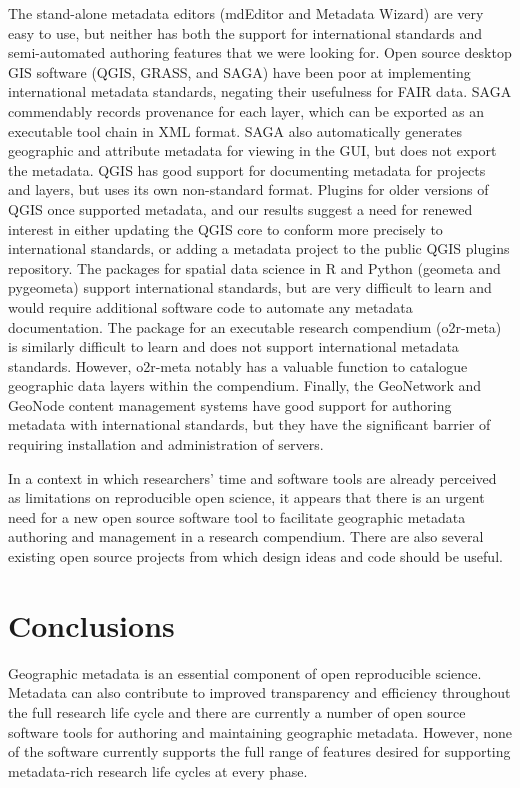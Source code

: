 \documentclass{isprs} %
\begin{document}
The stand-alone metadata editors (mdEditor and Metadata Wizard) are very easy to use, but neither has both the support for international standards and semi-automated authoring features that we were looking for.
Open source desktop GIS software (QGIS, GRASS, and SAGA) have been poor at implementing international metadata standards, negating their usefulness for FAIR data.
SAGA commendably records provenance for each layer, which can be exported as an executable tool chain in XML format.
SAGA also automatically generates geographic and attribute metadata for viewing in the GUI, but does not export the metadata.
QGIS has good support for documenting metadata for projects and layers, but uses its own non-standard format.
Plugins for older versions of QGIS once supported metadata, and our results suggest a need for renewed interest in either updating the QGIS core to conform more precisely to international standards, or adding a metadata project to the public QGIS plugins repository.
The packages for spatial data science in R and Python (geometa and pygeometa) support international standards, but are very difficult to learn and would require additional software code to automate any metadata documentation.
The package for an executable research compendium (o2r-meta) is similarly difficult to learn and does not support international metadata standards.
However, o2r-meta notably has a valuable function to catalogue geographic data layers within the compendium.
Finally, the GeoNetwork and GeoNode content management systems have good support for authoring metadata with international standards, but they have the significant barrier of requiring installation and administration of servers.

In a context in which researchers' time and software tools are already perceived as limitations on reproducible open science, it appears that there is an urgent need for a new open source software tool to facilitate geographic metadata authoring and management in a research compendium.
There are also several existing open source projects from which design ideas and code should be useful.

\section{Conclusions}

Geographic metadata is an essential component of open reproducible science.
Metadata can also contribute to improved transparency and efficiency throughout the full research life cycle and there are currently a number of open source software tools for authoring and maintaining geographic metadata.
However, none of the software currently supports the full range of features desired for supporting metadata-rich research life cycles at every phase.
\end{document}
